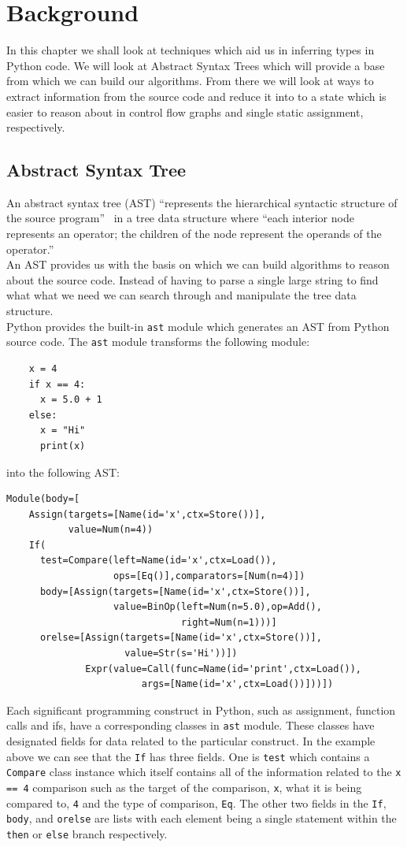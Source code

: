 \documentclass[12pt, titlepage]{article}
\begin{document}
\newpage
\section{Background}
In this chapter we shall look at techniques which aid us in inferring types in Python code. We will look at Abstract Syntax Trees which will provide a base from which we can build our algorithms. From there we will look at ways to extract information from the source code and reduce it into to a state which is easier to reason about in control flow graphs and single static assignment, respectively.

\subsection{Abstract Syntax Tree}
An abstract syntax tree (AST) ``represents the hierarchical syntactic structure of the source 
program''~\cite{dragonBook} in a tree data structure where ``each 
interior node represents an operator; the children of the node represent the 
operands of the operator.''~\cite{dragonBook} \\
\indent An AST provides us with the basis on which we can build algorithms to reason about the source code. Instead of having to parse a single large string to find what what we need we can search through and manipulate the tree data structure. \\
\indent Python provides the built-in \texttt{ast} module which generates an AST from Python source code. The \texttt{ast} module transforms the following module:
\begin{lstlisting}
    x = 4
    if x == 4:
      x = 5.0 + 1
    else:
      x = "Hi"
      print(x)
\end{lstlisting}
into the following AST:
\begin{verbatim}
Module(body=[
    Assign(targets=[Name(id='x',ctx=Store())],
           value=Num(n=4))
    If(
      test=Compare(left=Name(id='x',ctx=Load()),
                   ops=[Eq()],comparators=[Num(n=4)])
      body=[Assign(targets=[Name(id='x',ctx=Store())],
                   value=BinOp(left=Num(n=5.0),op=Add(),
                               right=Num(n=1)))]
      orelse=[Assign(targets=[Name(id='x',ctx=Store())],
                     value=Str(s='Hi'))])
              Expr(value=Call(func=Name(id='print',ctx=Load()),
                        args=[Name(id='x',ctx=Load())]))])
\end{verbatim}
Each significant programming construct in Python, such as assignment, function calls and ifs, have a corresponding classes in \texttt{ast} module. These classes have designated fields for data related to the particular construct. In the example above we can see that the \texttt{If} has three fields. One is \texttt{test} which contains a \texttt{Compare} class instance which itself contains all of the information related to the \texttt{x == 4} comparison such as the target of the comparison, \texttt{x}, what it is being compared to, \texttt{4} and the type of comparison, \texttt{Eq}. The other two fields in the \texttt{If}, \texttt{body}, and \texttt{orelse} are lists with each element being a single statement within the \texttt{then} or \texttt{else} branch respectively. \\
\end{document}
